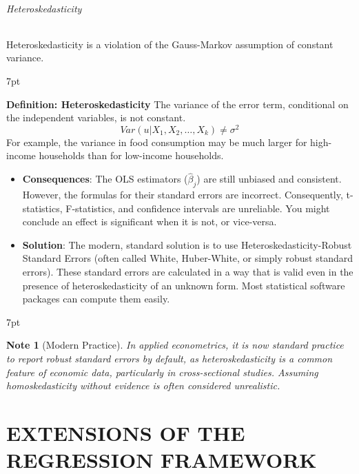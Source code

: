 \documentclass{article}
\providecommand{\tightlist}{
  \setlength{\itemsep}{0pt}
  \setlength{\parskip}{0pt}}
\newenvironment{blueblock}{
\def\FrameCommand{
  \hspace{1pt}
    {\color{DarkBlue}
    \vrule width 2pt}
    {\color{blueshade}
    \vrule width 4pt}
  \colorbox{blueshade}
}
\MakeFramed{
  \advance
  \hsize-
  \width
  \FrameRestore}
\noindent\hspace{-4.55pt}%
\begin{adjustwidth}{}{7pt}
\vspace{2pt}\vspace{2pt}
}
{\vspace{2pt}\end{adjustwidth}\endMakeFramed}
\newenvironment{greenblock}{%
\def\FrameCommand{%
  \hspace{1pt}%
    {\color{Green}%
    \vrule width 2pt}%
    {\color{greenshade}%
    \vrule width 4pt}%
  \colorbox{greenshade}%
}%
\MakeFramed{%
  \advance%
  \hsize-%
  \width%
  \FrameRestore}%
\noindent\hspace{-4.55pt}%
\begin{adjustwidth}{}{7pt}%
\vspace{2pt}\vspace{2pt}%
}
{%
\vspace{2pt}\end{adjustwidth}\endMakeFramed%
}
\newtheorem{note}{Note}
\begin{document}
\paragraph{Heteroskedasticity}
Heteroskedasticity is a violation of the Gauss-Markov assumption of constant variance.
\begin{greenblock}
\textbf{Definition: Heteroskedasticity}
The variance of the error term, conditional on the independent variables, is not constant.
\begin{equation}
    Var(u|X_1, X_2, \dots, X_k) \neq \sigma^2
\end{equation}
For example, the variance in food consumption may be much larger for high-income households than for low-income households.
\end{greenblock}

\begin{itemize}
    \tightlist
    \item \textbf{Consequences}: The OLS estimators ($\hat{\beta}_j$) are still unbiased and consistent. However, the formulas for their standard errors are incorrect. Consequently, t-statistics, F-statistics, and confidence intervals are unreliable. You might conclude an effect is significant when it is not, or vice-versa.
    \item \textbf{Solution}: The modern, standard solution is to use 
Heteroskedasticity-Robust Standard Errors
 (often called White, Huber-White, or simply robust standard errors). These standard errors are calculated in a way that is valid even in the presence of heteroskedasticity of an unknown form. Most statistical software packages can compute them easily.
\end{itemize}
\begin{blueblock}
\begin{note}[Modern Practice]
In applied econometrics, it is now standard practice to report robust standard errors by default, as heteroskedasticity is a common feature of economic data, particularly in cross-sectional studies. Assuming homoskedasticity without evidence is often considered unrealistic.
\end{note}
\end{blueblock}



\newpage
\part{EXTENSIONS OF THE REGRESSION FRAMEWORK}
\end{document}
